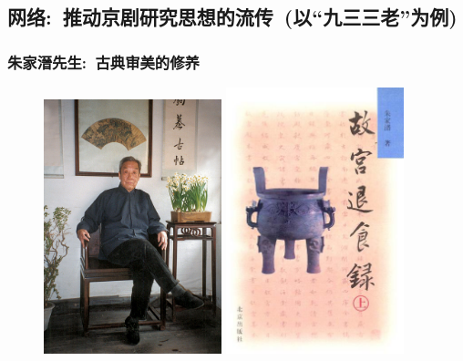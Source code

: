 \documentclass[cjk,slidestop,compress,mathserif,blue]{beamer}
\begin{document}
\subsection{网络:~推动京剧研究思想的流传~(以“九三三老”为例)}
\frame
{
	\frametitle{朱家溍先生:~古典审美的修养}
\begin{figure}[h!]
\centering
\vspace{-0.1in}
\includegraphics[height=0.64\textwidth,width=0.46\textwidth,viewport=0 0 500 720,clip]{Figures/Zhu_Jiajin.jpg}
\hskip 5pt
\includegraphics[height=0.64\textwidth,width=0.46\textwidth,viewport=0 0 450 610,clip]{Figures/Zhu_Tuishilu.jpg}
\label{Zhu_Jiajin}
\end{figure}
}
\end{document}
